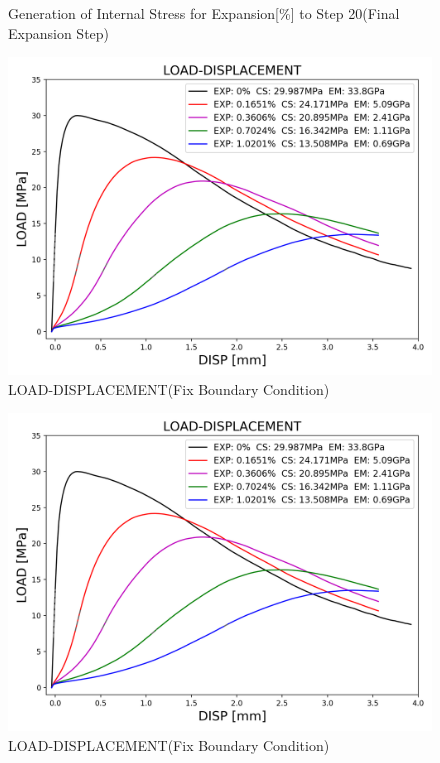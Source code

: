 \begin{figure}[ht!]
    

\caption{Generation of Internal Stress for Expansion[\%] to Step 20(Final Expansion Step)}
\label{fig:A30P25_stress}
\end{figure}

\begin{figure}[ht!]
    \centering
    \includegraphics[width=0.8\linewidth]{Files/exp_3D/ASR/S13A30P25FIX-LOAD-DISPLACEMENT.png}
    \caption{LOAD-DISPLACEMENT(Fix Boundary Condition)}
    \label{fig:S13A30P25FIX-LOAD-DISPLACEMENT}
\end{figure}


\begin{figure}[ht!]
    \centering
    \includegraphics[width=0.8\linewidth]{Files/exp_3D/ASR/S13A30P25FIX-LOAD-DISPLACEMENT.png}
    \caption{LOAD-DISPLACEMENT(Fix Boundary Condition)}
    \label{fig:S13A30P25FIX-LOAD-DISPLACEMENT}
\end{figure}

